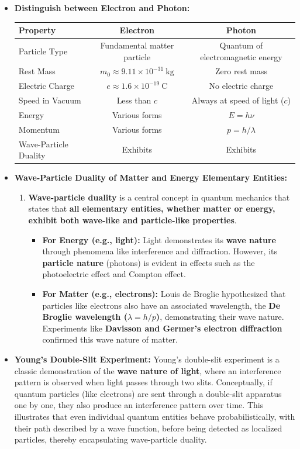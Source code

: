 \documentclass[12pt]{article}
\begin{document}
\begin{itemize}
    \item \textbf{Distinguish between Electron and Photon:}
\begin{table}[h]
\begin{tabular}{|l|c|c|}
\hline
\textbf{Property} & \textbf{Electron} & \textbf{Photon} \\
\hline
Particle Type & Fundamental matter particle & Quantum of electromagnetic energy \\
\hline
Rest Mass & $m_0 \approx 9.11 \times 10^{-31}\ \text{kg}$ & Zero rest mass \\
\hline
Electric Charge & $e \approx 1.6 \times 10^{-19}\ \text{C}$ & No electric charge \\
\hline
Speed in Vacuum & Less than $c$ & Always at speed of light ($c$) \\
\hline
Energy & Various forms & $E = h\nu$ \\
\hline
Momentum & Various forms & $p = h/\lambda$ \\
\hline
Wave-Particle Duality & Exhibits & Exhibits \\
\hline
\end{tabular}
\end{table}
    \item \textbf{Wave-Particle Duality of Matter and Energy Elementary Entities:}
    \begin{enumerate}[label=\alph*.]
        \item \textbf{Wave-particle duality} is a central concept in quantum mechanics that states that \textbf{all elementary entities, whether matter or energy, exhibit both wave-like and particle-like properties}.
        \begin{itemize}
            \item \textbf{For Energy (e.g., light):} Light demonstrates its \textbf{wave nature} through phenomena like interference and diffraction. However, its \textbf{particle nature} (photons) is evident in effects such as the photoelectric effect and Compton effect.
            \item \textbf{For Matter (e.g., electrons):} Louis de Broglie hypothesized that particles like electrons also have an associated wavelength, the \textbf{De Broglie wavelength ($\lambda=h/p$)}, demonstrating their wave nature. Experiments like \textbf{Davisson and Germer's electron diffraction} confirmed this wave nature of matter.
        \end{itemize}
    \end{enumerate}
    \item \textbf{Young's Double-Slit Experiment:} Young's double-slit experiment is a classic demonstration of the \textbf{wave nature of light}, where an interference pattern is observed when light passes through two slits. Conceptually, if quantum particles (like electrons) are sent through a double-slit apparatus one by one, they also produce an interference pattern over time. This illustrates that even individual quantum entities behave probabilistically, with their path described by a wave function, before being detected as localized particles, thereby encapsulating wave-particle duality.
\end{itemize}
\end{document}
